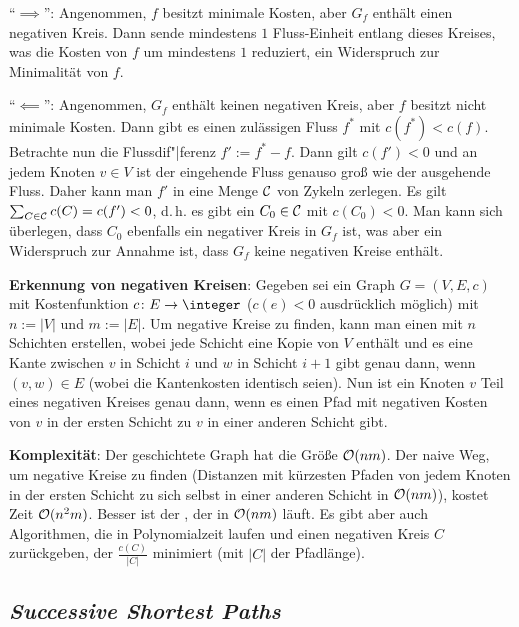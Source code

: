\begin{Beweis}
    "`$\implies$"':
    Angenommen, $f$ besitzt minimale Kosten, aber $G_f$ enthält einen negativen Kreis.
    Dann sende mindestens $1$ Fluss-Einheit entlang dieses Kreises, was die Kosten von $f$
    um mindestens $1$ reduziert, ein Widerspruch zur Minimalität von $f$.

    "`$\impliedby$"':
    Angenommen, $G_f$ enthält keinen negativen Kreis, aber $f$ besitzt nicht minimale Kosten.
    Dann gibt es einen zulässigen Fluss $f^\ast$ mit $c(f^\ast) < c(f)$.
    Betrachte nun die Flussdif"|ferenz $f' := f^\ast - f$.
    Dann gilt $c(f') < 0$ und an jedem Knoten $v \in V$ ist der eingehende Fluss
    genauso groß wie der ausgehende Fluss.
    Daher kann man $f'$ in eine Menge $\mathcal{C}$ von Zykeln zerlegen.
    Es gilt $\sum_{C \in \mathcal{C}} c(C) = c(f') < 0$,
    d.\,h. es gibt ein $C_0 \in \mathcal{C}$ mit $c(C_0) < 0$.
    Man kann sich überlegen, dass $C_0$ ebenfalls ein negativer Kreis in $G_f$ ist,
    was aber ein Widerspruch zur Annahme ist, dass $G_f$ keine negativen Kreise enthält.
\end{Beweis}

\linie

\textbf{Erkennung von negativen Kreisen}:
Gegeben sei ein Graph $G = (V, E, c)$ mit Kostenfunktion $c\colon E \to \integer$
($c(e) < 0$ ausdrücklich möglich) mit $n := |V|$ und $m := |E|$.
Um negative Kreise zu finden, kann man einen  mit $n$ Schichten
erstellen, wobei jede Schicht eine Kopie von $V$ enthält und es
eine Kante zwischen $v$ in Schicht $i$ und $w$ in Schicht $i+1$ gibt genau dann, wenn
$(v, w) \in E$ (wobei die Kantenkosten identisch seien).
Nun ist ein Knoten $v$ Teil eines negativen Kreises genau dann, wenn
es einen Pfad mit negativen Kosten von $v$ in der ersten Schicht zu $v$ in einer anderen Schicht
gibt.

\textbf{Komplexität}:
Der geschichtete Graph hat die Größe $\mathcal{O}(nm)$.
Der naive Weg, um negative Kreise zu finden (Distanzen mit kürzesten Pfaden von jedem Knoten in
der ersten Schicht zu sich selbst in einer anderen Schicht in $\mathcal{O}(nm)$), kostet Zeit $\mathcal{O}(n^2 m)$.
Besser ist der , der in $\mathcal{O}(nm)$ läuft.
Es gibt aber auch Algorithmen, die in Polynomialzeit laufen und einen negativen Kreis
$C$ zurückgeben, der $\frac{c(C)}{|C|}$ minimiert (mit $|C|$ der Pfadlänge).

\pagebreak

\subsection{%
    \emph{Successive Shortest Paths}%
}

